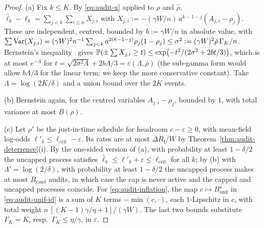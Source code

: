 \begin{proof}
(a) Fix $k\le K$. By \eqref{eq:audit-x} applied to $\rho$ and $\hat\rho$,
$\hat\ell_k-\ell_k=\sum_{j<k}\sum_{i\le n}X_{j,i}$ with
$X_{j,i}:=-(\gamma W/n)\,a^{k-1-j}(A_{j,i}-\rho_j)$. These are independent,
centred, bounded by $b:=\gamma W/n$ in absolute value, with
$\sum\operatorname{Var}(X_{j,i})=(\gamma W)^2n^{-1}\sum_{j<k}a^{2(k-1-j)}\rho_j(1-\rho_j)
\le\sigma^2:=(\gamma W)^2\bar\rho\,\Gamma_K/n$. Bernstein's
inequality~\cite{boucheron2013concentration} gives
$\mathbb{P}(\pm\sum X_{j,i}\ge t)\le\exp\bigl(-t^2/(2\sigma^2+2bt/3)\bigr)$, which is at most
$e^{-\Lambda}$ for $t=\sqrt{2\sigma^2\Lambda}+2b\Lambda/3=\varepsilon(\Lambda,\bar\rho)$ (the sub-gamma form would allow $b\Lambda/3$ for the linear term; we keep the more conservative constant).
Take $\Lambda=\log(2K/\delta)$ and a union bound over the $2K$ events.

(b) Bernstein again, for the centred variables $A_{j,i}-\rho_j$, bounded by $1$,
with total variance at most $B(\rho)$.

(c) Let $\rho'$ be the just-in-time schedule for headroom $c-\varepsilon\ge0$,
with mean-field log-odds $\ell'_k\le\ell_{\mathrm{crit}}-\varepsilon$. Its rates
are at most $\Delta R_{\mathrm f}/W$ by Theorem~\ref{thm:audit-deterrence}(i). By the
one-sided version of (a), with probability at least $1-\delta/2$ the uncapped
process satisfies $\hat\ell_k\le\ell'_k+\varepsilon\le\ell_{\mathrm{crit}}$ for
all $k$; by (b) with $\Lambda'=\log(2/\delta)$, with probability at least
$1-\delta/2$ the uncapped process makes at most $B_{\mathrm{rand}}$ audits, in
which case the cap is never active and the capped and uncapped processes
coincide. For \eqref{eq:audit-inflation}, the map
$c\mapsto B^\star_{\mathrm{unif}}$ in \eqref{eq:audit-unif-id} is a sum of
$K$ terms $-\min(c,\cdot)$, each $1$-Lipschitz in $c$, with total weight
$n\,[(K-1)\gamma/\eta+1]/(\gamma W)$. The last two bounds substitute
$\Gamma_K=K$, resp.\ $\Gamma_K\le\eta/\gamma$, in $\varepsilon$.
\end{proof}

